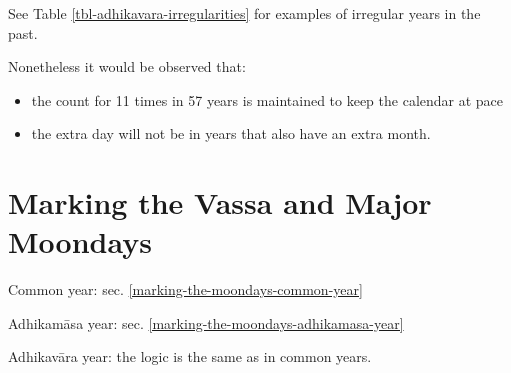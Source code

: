 \documentclass[11pt,oneside]{memoir-article}
\begin{document}
See Table \ref{tbl-adhikavara-irregularities} for examples of irregular years in the past.

Nonetheless it would be observed that:

\begin{itemize}
\item the count for 11 times in 57 years is maintained to keep the
calendar at pace
\item the extra day will not be in years that also have an extra month.
\end{itemize}

\section{Marking the Vassa and Major Moondays}
\label{sec-2-3}

Common year: sec. \ref{marking-the-moondays-common-year}

Adhikamāsa year: sec. \ref{marking-the-moondays-adhikamasa-year}

Adhikavāra year: the logic is the same as in common years.
\end{document}
